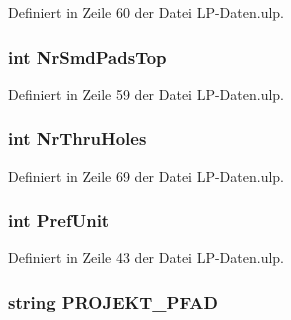 Definiert in Zeile 60 der Datei L\+P-\/\+Daten.\+ulp.

\hypertarget{_l_p-_daten_8ulp_a4904b3dd111d987f638dee0ff3dc9c94}{}
\subsubsection[{Nr\+Smd\+Pads\+Top}]{\setlength{\rightskip}{0pt plus 5cm}int Nr\+Smd\+Pads\+Top}\label{_l_p-_daten_8ulp_a4904b3dd111d987f638dee0ff3dc9c94}


Definiert in Zeile 59 der Datei L\+P-\/\+Daten.\+ulp.

\hypertarget{_l_p-_daten_8ulp_a278e43783e245ada15421e20f92709ab}{}
\subsubsection[{Nr\+Thru\+Holes}]{\setlength{\rightskip}{0pt plus 5cm}int Nr\+Thru\+Holes}\label{_l_p-_daten_8ulp_a278e43783e245ada15421e20f92709ab}


Definiert in Zeile 69 der Datei L\+P-\/\+Daten.\+ulp.

\hypertarget{_l_p-_daten_8ulp_a9cd76f4a7dccdb177ae9e523cf852394}{}
\subsubsection[{Pref\+Unit}]{\setlength{\rightskip}{0pt plus 5cm}int Pref\+Unit}\label{_l_p-_daten_8ulp_a9cd76f4a7dccdb177ae9e523cf852394}


Definiert in Zeile 43 der Datei L\+P-\/\+Daten.\+ulp.

\hypertarget{_l_p-_daten_8ulp_a646f3371d3767b31d185e665e471cd8c}{}
\subsubsection[{P\+R\+O\+J\+E\+K\+T\+\_\+\+P\+F\+A\+D}]{\setlength{\rightskip}{0pt plus 5cm}string P\+R\+O\+J\+E\+K\+T\+\_\+\+P\+F\+A\+D}\label{_l_p-_daten_8ulp_a646f3371d3767b31d185e665e471cd8c}


